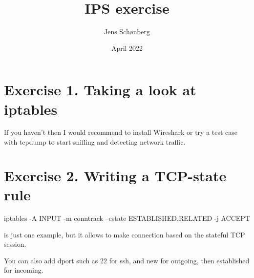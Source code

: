 \documentclass[12pt, letterpaper, twoside]{article}
\title{IPS exercise}
\author{Jens Schønberg}
\date{April 2022}
\begin{document}
\begin{titlepage}
\maketitle
\end{titlepage}

\section{Exercise 1. Taking a look at iptables}
If you haven't then I would recommend to install Wireshark or try a test case with tcpdump to start sniffing and detecting network traffic.


\section{Exercise 2. Writing a TCP-state rule}
iptables -A INPUT -m conntrack --cstate ESTABLISHED,RELATED -j ACCEPT

is just one example, but it allows to make connection based on the stateful TCP session.

You can also add dport such as 22 for ssh, and new for outgoing, then established for incoming.
\end{document}
